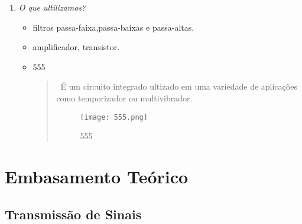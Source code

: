 \documentclass{beamer}
\begin{document}
\begin{frame}

   \begin{enumerate}

      \item \textit{O que ultilizamos?}

	       \begin{itemize}

		  \item filtros passa-faixa,passa-baixas e passa-altas.

		  \item amplificador, transistor.

		  \item {555} 

		     \begin{quote}

			\ É um circuito integrado ultizado em uma variedade de aplicações como temporizador ou multivibrador.

			\begin{figure}[t]

			\centering

			\texttt{[image: 555.png]}

			\caption{555}

			\label{fig:555}

			\end{figure}

		     \end{quote}

	       \end{itemize}

   \end{enumerate}

\end{frame}

\section{Embasamento Teórico}
\subsection{Transmissão de Sinais}
\end{document}
